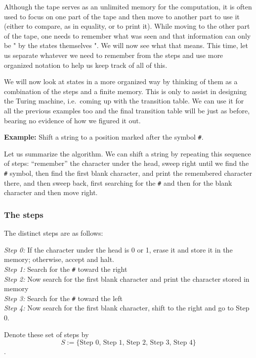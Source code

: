 Although the tape serves as an unlimited memory for the computation, it
is often used to focus on one part of the tape and then move to another
part to use it (either to compare, as in equality, or to print it).
While moving to the other part of the tape, one needs to remember what
was seen and that information can only be " by the states themselves ".
We will now see what that means. This time, let us separate whatever we
need to remember from the steps and use more organized notation to help
us keep track of all of this.

We will now look at states in a more organized way by thinking of them
as a combination of the steps and a finite memory. This is only to
assist in designing the Turing machine, i.e.~coming up with the
transition table. We can use it for all the previous examples too and
the final transition table will be just as before, bearing no evidence
of how we figured it out.

\textbf{Example:} Shift a string to a position marked after the symbol
\texttt{\#}.

Let us summarize the algorithm. We can shift a string by repeating this
sequence of steps: ``remember'' the character under the head, sweep
right until we find the \texttt{\#} symbol, then find the first blank
character, and print the remembered character there, and then sweep
back, first searching for the \texttt{\#} and then for the blank
character and then move right.

\hypertarget{the-steps}{%
\subsubsection{The steps}\label{the-steps}}

The distinct steps are as follows:

\emph{Step 0:} If the character under the head is 0 or 1, erase it and
store it in the memory; otherwise, accept and halt.\\
\emph{Step 1:} Search for the \texttt{\#} toward the right\\
\emph{Step 2:} Now search for the first blank character and print the
character stored in memory\\
\emph{Step 3:} Search for the \texttt{\#} toward the left\\
\emph{Step 4:} Now search for the first blank character, shift to the
right and go to Step 0.

Denote these set of steps by
\[S := \{\text{Step 0, Step 1, Step 2, Step 3, Step 4}\}\].

